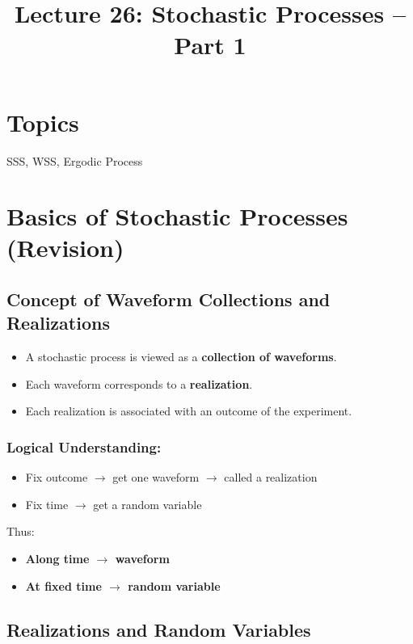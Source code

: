 \documentclass[12pt]{article}
\title{Lecture 26: Stochastic Processes -- Part 1}
\author{}
\date{}
\begin{document}
\maketitle

\section*{Topics}
SSS, WSS, Ergodic Process

\section{Basics of Stochastic Processes (Revision)}

\subsection{Concept of Waveform Collections and Realizations}

\begin{itemize}
    \item A stochastic process is viewed as a \textbf{collection of waveforms}.
    \item Each waveform corresponds to a \textbf{realization}.
    \item Each realization is associated with an outcome of the experiment.
\end{itemize}

\subsubsection*{Logical Understanding:}

\begin{itemize}
    \item Fix outcome $\rightarrow$ get one waveform $\rightarrow$ called a realization
    \item Fix time $\rightarrow$ get a random variable
\end{itemize}

Thus:

\begin{itemize}
    \item \textbf{Along time $\rightarrow$ waveform}
    \item \textbf{At fixed time $\rightarrow$ random variable}
\end{itemize}

\subsection{Realizations and Random Variables}
\end{document}
